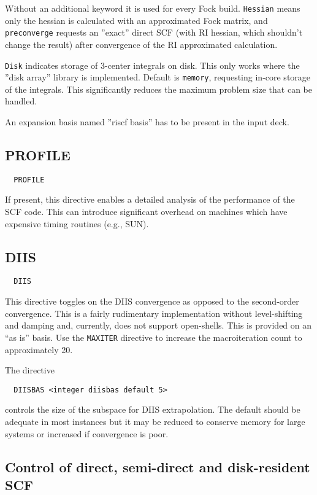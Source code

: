 Without an additional keyword it is used for every Fock build. \verb+Hessian+
means only the hessian is calculated with an approximated Fock matrix, and
\verb+preconverge+ requests an ''exact'' direct SCF (with RI hessian, which
shouldn't change the result) after convergence of the
RI approximated calculation.

\verb+Disk+ indicates storage of 3-center integrals on disk. This only
works where the ''disk array'' library is implemented. Default is
\verb+memory+, requesting in-core storage of the integrals. This
significantly reduces the maximum problem size that can be handled.

An expansion basis named ''riscf basis'' has to be present in the input deck.

\subsection{PROFILE}

\begin{verbatim}
  PROFILE
\end{verbatim}

If present, this directive enables a detailed analysis of the
performance of the SCF code.  This can introduce significant
overhead on machines which have expensive timing routines (e.g., SUN).

\subsection{DIIS}
\begin{verbatim}
  DIIS
\end{verbatim}

This directive toggles on the DIIS convergence as opposed to the
second-order convergence. This is a fairly rudimentary implementation
without level-shifting and damping and, currently, does not support
open-shells. This is provided on an ``as is'' basis. Use the
\verb+MAXITER+ directive to increase the macroiteration count to
approximately 20.

The directive
\begin{verbatim}
  DIISBAS <integer diisbas default 5>
\end{verbatim}
controls the size of the subspace for DIIS extrapolation.  The default
should be adequate in most instances but it may be reduced to conserve
memory for large systems or increased if convergence is poor.

\subsection{Control of direct, semi-direct and disk-resident SCF}

